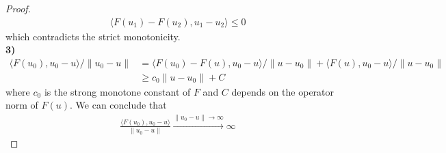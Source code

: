 \begin{proof}
\begin{align*}
	\langle F(u_1) - F(u_2), u_1 - u_2 \rangle \le 0
\end{align*}
which contradicts the strict monotonicity. \\
\textbf{3)}
\begin{align*}
	\langle F(u_0), u_0 - u \rangle \slash \|u_0 - u\|
	&= \langle F(u_0) - F(u), u_0 - u \rangle  \slash \|u - u_0 \| + \langle F(u), u_0 - u \rangle \slash \|u - u_0\|\\
	&\ge c_0 \|u - u_0\| + C
\end{align*}
where $c_0$ is the strong monotone constant of $F$ and $C$ depends on the operator norm of $F(u)$. We can conclude that
\begin{align*}
	\frac{\langle F(u_0), u_0 - u \rangle }{\|u_0 - u\|} \overset{\|u_0 -u\| \rightarrow \infty}{\longrightarrow} \infty
\end{align*}
\end{proof}


